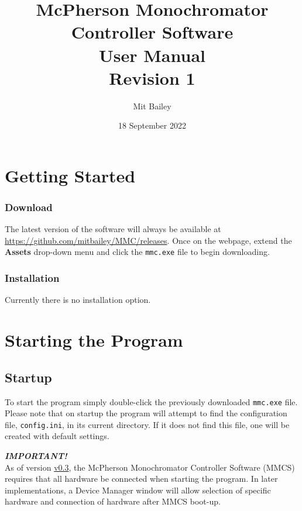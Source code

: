 \documentclass{article}
\title{%
    McPherson Monochromator Controller Software \\
    User Manual \\
    \small Revision 1}
\author{Mit Bailey}
\date{18 September 2022}
\begin{document}
\maketitle
\newpage

\tableofcontents
\newpage

\section{Getting Started} \label{section:gettingstarted}

\subsubsection{Download}
The latest version of the software will always be available at \url{https://github.com/mitbailey/MMC/releases}. Once on the webpage, extend the \textbf{Assets} drop-down menu and click the \verb|mmc.exe| file to begin downloading.

\subsubsection{Installation}
Currently there is no installation option.

\section{Starting the Program} \label{section:startingtheprogram}

\subsection{Startup} \label{subsection:startup}
To start the program simply double-click the previously downloaded \verb|mmc.exe| file. Please note that on startup the program will attempt to find the configuration file, \verb|config.ini|, in its current directory. If it does not find this file, one will be created with default settings. 


\begin{tcolorbox}
    {\color{red}\textbf{\emph{IMPORTANT!}}} \\
    As of version \href{https://github.com/mitbailey/MMC/releases/tag/v0.3}{v0.3}, the McPherson Monochromator Controller Software (MMCS) requires that all hardware be connected when starting the program. In later implementations, a Device Manager window will allow selection of specific hardware and connection of hardware after MMCS boot-up.
\end{tcolorbox}
\end{document}
